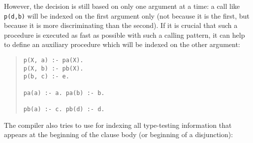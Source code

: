 However, the decision is still based on only one argument at a time:
a call like {\tt p(d,b)} will be indexed on the first argument only
(not because it is the first, but because it is more discriminating
than the second).  If it is crucial that such a procedure is executed
as fast as possible with such a calling pattern, it can help to define
an auxiliary procedure which will be indexed on the other argument:
\begin{quote}
\begin{verbatim}
p(X, a) :- pa(X).
p(X, b) :- pb(X).
p(b, c) :- e.

pa(a) :- a. pa(b) :- b.

pb(a) :- c. pb(d) :- d.
\end{verbatim}
\end{quote}

The compiler also tries to use for indexing all type-testing information
that appears at the beginning of the clause body (or beginning of a disjunction):
